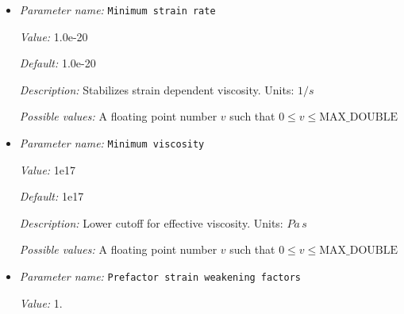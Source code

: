 \begin{itemize}
{\it Value:} 1e12


{\it Default:} 1e12


{\it Description:} Limits the maximum value of the yield stress determined by the drucker-prager plasticity parameters. Default value is chosen so this is not automatically used. Values of 100e6--1000e6 $Pa$ have been used in previous models. Units: $Pa$


{\it Possible values:} A floating point number $v$ such that $0 \leq v \leq \text{MAX\_DOUBLE}$
\item {\it Parameter name:} {\tt Minimum strain rate}
\label{parameters:Material model/Visco Plastic/Minimum strain rate}
\label{parameters:Material_20model/Visco_20Plastic/Minimum_20strain_20rate}


{\it Value:} 1.0e-20


{\it Default:} 1.0e-20


{\it Description:} Stabilizes strain dependent viscosity. Units: $1 / s$


{\it Possible values:} A floating point number $v$ such that $0 \leq v \leq \text{MAX\_DOUBLE}$
\item {\it Parameter name:} {\tt Minimum viscosity}
\label{parameters:Material model/Visco Plastic/Minimum viscosity}
\label{parameters:Material_20model/Visco_20Plastic/Minimum_20viscosity}


{\it Value:} 1e17


{\it Default:} 1e17


{\it Description:} Lower cutoff for effective viscosity. Units: $Pa \, s$


{\it Possible values:} A floating point number $v$ such that $0 \leq v \leq \text{MAX\_DOUBLE}$
\item {\it Parameter name:} {\tt Prefactor strain weakening factors}
\label{parameters:Material model/Visco Plastic/Prefactor strain weakening factors}
\label{parameters:Material_20model/Visco_20Plastic/Prefactor_20strain_20weakening_20factors}


{\it Value:} 1.



\end{itemize}
